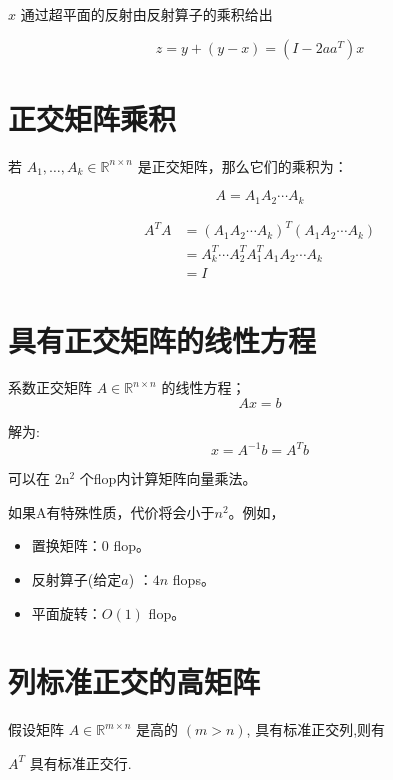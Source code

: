 \begin{corollary}
    $ x $ 通过超平面的反射由反射算子的乘积给出

    $$ z=y+(y-x)=\left(I-2 a a^{T}\right) x $$
\end{corollary}

\section{正交矩阵乘积}

若 $ A_{1}, \ldots, A_{k} \in \mathbb{R}^{n \times n} $ 是正交矩阵，那么它们的乘积为：

$$ A=A_{1} A_{2} \cdots A_{k} $$

\begin{corollary}[正交矩阵乘积的正交性]

$$\begin{aligned}
    A^{T} A&=\left(A_{1} A_{2} \cdots A_{k}\right)^{T}\left(A_{1} A_{2} \cdots A_{k}\right)\\
    &=A_{k}^{T} \cdots A_{2}^{T} A_{1}^{T} A_{1} A_{2} \cdots A_{k}\\
    &=I
\end{aligned}$$

\end{corollary}


\section{具有正交矩阵的线性方程}

系数正交矩阵 $ A \in \mathbb{R}^{n \times n} $ 的线性方程；
$$
A x=b
$$

解为:
$$
x=A^{-1} b=A^{T} b
$$

可以在 $ 2 \mathrm{n}^{2} $ 个flop内计算矩阵向量乘法。 

如果A有特殊性质，代价将会小于$n^2$。例如，

\begin{itemize}
    \item 置换矩阵：$0$ flop。
    \item 反射算子(给定$a$) ：$4n$ flops。
    \item 平面旋转：$O(1)$ flop。
\end{itemize}

\section{列标准正交的高矩阵}

\begin{theorem}
    假设矩阵 $ A \in \mathbb{R}^{m \times n} $ 是高的 $ ({m}>{n}) $, 具有标准正交列,则有

    $ A^{T} $ 具有标准正交行.
\end{theorem}

